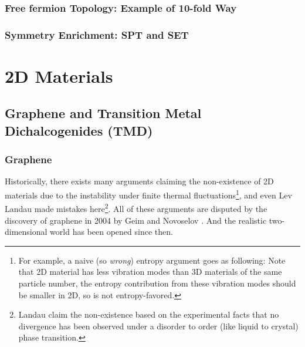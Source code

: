         \subsubsection{Free fermion Topology: Example of 10-fold Way}

        \subsubsection{Symmetry Enrichment: SPT and SET}

\section{2D Materials}
    \subsection{Graphene and Transition Metal Dichalcogenides (TMD)}
        \subsubsection{Graphene}
            Historically, there exists many arguments claiming the non-existence of 2D materials due to the instability under finite thermal fluctuations\footnote{For example, a naive (so \emph{wrong}) entropy argument goes as following: Note that 2D material has less vibration modes than 3D materials of the same particle number, the entropy contribution from these vibration modes should be smaller in 2D, so is not entropy-favored.}, and even Lev Landau made mistakes here\footnote{Landau claim the non-existence based on the experimental facts that no divergence has been observed under a disorder to order (like liquid to crystal) phase transition.}. All of these arguments are disputed by the discovery of graphene in 2004 by Geim and Novoselov \cite{novoselov2004electric}. And the realistic two-dimensional world has been opened since then.

